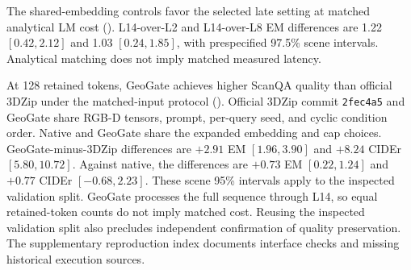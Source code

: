 \begin{table}[t]
\centering
\caption{\textbf{LLaVA-3D ScanQA analytical-cost controls.} A separate validation runner adjusts early-layer budgets to input length to match L14/128 LM cost.}
\label{tab:costmatched}
\end{table}

The shared-embedding controls favor the selected late setting at matched analytical LM cost (). L14-over-L2 and L14-over-L8 EM differences are 1.22 $[0.42,2.12]$ and 1.03 $[0.24,1.85]$, with prespecified 97.5\% scene intervals. Analytical matching does not imply matched measured latency.

\begin{table}[t]
\centering
\caption{\textbf{LLaVA-3D ScanQA comparison with official 3DZip.} Full validation set; compressed arms retain 128 spatial tokens, with GeoGate pruning after L14. Equal counts do not imply equal computation.}
\label{tab:official128}
\end{table}

At 128 retained tokens, GeoGate achieves higher ScanQA quality than official 3DZip under the matched-input protocol (). Official 3DZip commit \texttt{2fec4a5} and GeoGate share RGB-D tensors, prompt, per-query seed, and cyclic condition order. Native and GeoGate share the expanded embedding and cap choices. GeoGate-minus-3DZip differences are $+2.91$ EM $[1.96,3.90]$ and $+8.24$ CIDEr $[5.80,10.72]$. Against native, the differences are $+0.73$ EM $[0.22,1.24]$ and $+0.77$ CIDEr $[-0.68,2.23]$. These scene 95\% intervals apply to the inspected validation split. GeoGate processes the full sequence through L14, so equal retained-token counts do not imply matched cost. Reusing the inspected validation split also precludes independent confirmation of quality preservation. The supplementary reproduction index documents interface checks and missing historical execution sources.

